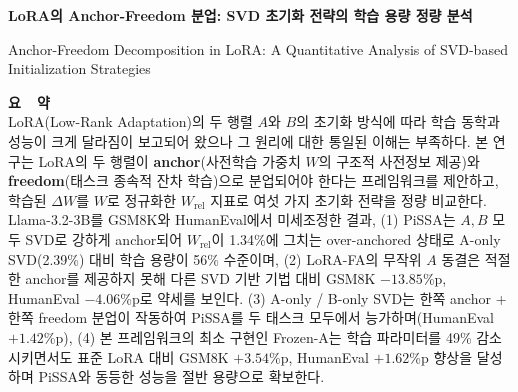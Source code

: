 \documentclass[a4paper,10pt]{article}
\begin{document}
\begin{center}
{\Large\bfseries LoRA의 Anchor-Freedom 분업: SVD 초기화 전략의 학습 용량 정량 분석\par}
\vspace{0.5em}
{\large Anchor-Freedom Decomposition in LoRA: A Quantitative Analysis of SVD-based Initialization Strategies\par}
\vspace{1em}
\end{center}

\begin{center}
\begin{minipage}{0.92\textwidth}
\noindent\textbf{요\ \ 약}\\[0.3em]
\small
LoRA(Low-Rank Adaptation)의 두 행렬 $A$와 $B$의 초기화 방식에 따라 학습 동학과 성능이 크게 달라짐이 보고되어 왔으나 그 원리에 대한 통일된 이해는 부족하다.
본 연구는 LoRA의 두 행렬이 \textbf{anchor}(사전학습 가중치 $W$의 구조적 사전정보 제공)와 \textbf{freedom}(태스크 종속적 잔차 학습)으로 분업되어야 한다는 프레임워크를 제안하고, 학습된 $\Delta W$를 $W$로 정규화한 $W_{\text{rel}}$ 지표로 여섯 가지 초기화 전략을 정량 비교한다.
Llama-3.2-3B를 GSM8K와 HumanEval에서 미세조정한 결과, (1) PiSSA는 $A,B$ 모두 SVD로 강하게 anchor되어 $W_{\text{rel}}$이 1.34\%에 그치는 over-anchored 상태로 A-only SVD(2.39\%) 대비 학습 용량이 56\% 수준이며, (2) LoRA-FA의 무작위 $A$ 동결은 적절한 anchor를 제공하지 못해 다른 SVD 기반 기법 대비 GSM8K $-13.85$\%p, HumanEval $-4.06$\%p로 약세를 보인다.
(3) A-only / B-only SVD는 한쪽 anchor + 한쪽 freedom 분업이 작동하여 PiSSA를 두 태스크 모두에서 능가하며(HumanEval $+1.42$\%p), (4) 본 프레임워크의 최소 구현인 Frozen-A는 학습 파라미터를 49\% 감소시키면서도 표준 LoRA 대비 GSM8K $+3.54$\%p, HumanEval $+1.62$\%p 향상을 달성하며 PiSSA와 동등한 성능을 절반 용량으로 확보한다.
\end{minipage}
\end{center}
\vspace{1.5em}
\end{document}
